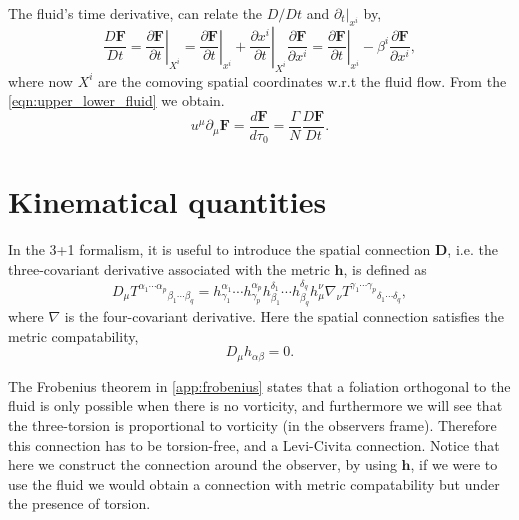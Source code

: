 The fluid's time derivative, can relate the $D/Dt$ and $\partial_t|_{x^i}$ by,
\begin{equation}
    \frac{D\mathbf{F}}{Dt}=\left.\frac{\partial \mathbf{F}}{\partial t}\right|_{X^i}=\left.\frac{\partial \mathbf{F}}{\partial t}\right|_{x^i}+\left.\frac{\partial x^i}{\partial t}\right|_{X^i}\frac{\partial \mathbf{F}}{\partial x^i}=\left.\frac{\partial \mathbf{F}}{\partial t}\right|_{x^i}-\beta^i\frac{\partial \mathbf{F}}{\partial x^i},
    \label{eqn:fluid_total_time_expression}
\end{equation}
where now $X^i$ are the comoving spatial coordinates w.r.t the fluid flow. From the \cref{eqn:upper_lower_fluid} we obtain.
\begin{equation}
    u^\mu\partial_\mu \mathbf{F}=\frac{d\mathbf{F}}{d\tau_0}=\frac{\Gamma}{N}\frac{D\mathbf{F}}{Dt}.
    \label{eqn:relation_total_time_fluid_vec}
\end{equation}



\section{Kinematical quantities}

In the 3+1 formalism, it is useful to introduce the spatial connection $\mathbf{D}$, i.e. the three-covariant derivative associated with the metric $\mathbf{h}$, is defined as
\begin{equation}
    D_\mu T^{\alpha_1\cdots\alpha_p}{}_{\beta_1\cdots\beta_q}=h^{\alpha_1}_{\gamma_1}\cdots h^{\alpha_p}_{\gamma_p}h^{\delta_1}_{\beta_1}\cdots h^{\delta_q}_{\beta_q} h_\mu^\nu \nabla_\nu T^{\gamma_1\cdots\gamma_p}{}_{\delta_1\cdots\delta_q},
    \label{eqn:spatial_cov_dev_def}
\end{equation}
where $\nabla$ is the four-covariant derivative. Here the spatial connection satisfies the metric compatability,
\begin{equation}
    D_\mu h_{\alpha\beta}=0.
\end{equation}

The Frobenius theorem in \cref{app:frobenius} states that a foliation orthogonal to the fluid is only possible when there is no vorticity, and furthermore we will see that the three-torsion is proportional to vorticity (in the observers frame).
Therefore this connection has to be torsion-free, and a Levi-Civita connection. 
Notice that here we construct the connection around the observer, by using $\mathbf{h}$, if we were to use the fluid we would obtain a connection with metric compatability but under the presence of torsion. 

